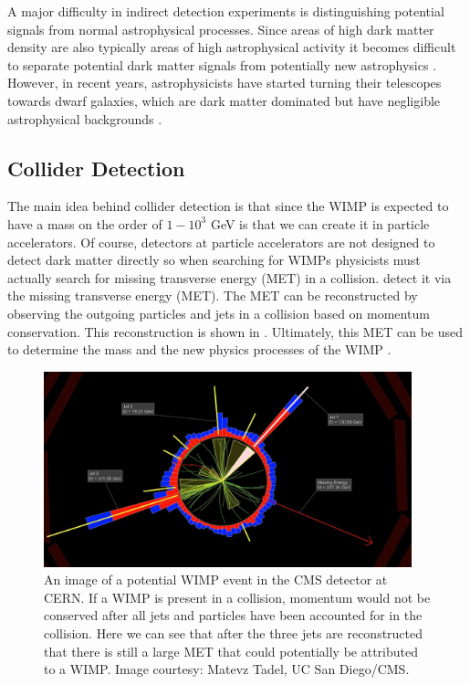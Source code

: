 A major difficulty in indirect detection experiments is distinguishing potential signals from normal astrophysical processes.  Since areas of high dark matter density are also typically areas of high astrophysical activity it becomes difficult to separate potential dark matter signals from potentially new astrophysics \cite{zitzer2015search}.  However, in recent years, astrophysicists have started turning their telescopes towards dwarf galaxies, which are dark matter dominated but have negligible astrophysical backgrounds \cite{conrad2014indirect}.  %



\subsection{Collider Detection}

The main idea behind collider detection is that since the WIMP is expected to have a mass on the order of $1-10^3$ GeV is that we can create it in particle accelerators.  Of course, detectors at particle accelerators are not designed to detect dark matter directly so when searching for WIMPs physicists must actually search for missing transverse energy (MET) in a collision. detect it via the missing transverse energy (MET).  The MET can be reconstructed by observing the outgoing particles and jets in a collision based on momentum conservation.  This reconstruction is shown in .  Ultimately, this MET can be used to determine the mass and the new physics processes of the WIMP \cite{bi2013status}.

\begin{figure}[b]
	\centering
	\includegraphics[width=0.95\textwidth]{collider_detection_cms}
	\caption{An image of a potential WIMP event in the CMS detector at CERN.  If a WIMP is present in a collision, momentum would not be conserved after all jets and particles have been accounted for in the collision.  Here we can see that after the three jets are reconstructed that there is still a large MET that could potentially be attributed to a WIMP.  Image courtesy: Matevz Tadel, UC San Diego/CMS.}
	\label{fig:collider_detection}
\end{figure}

